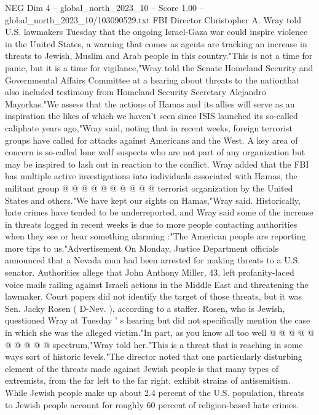 \begin{textsample}{NEG Dim 4 – global\_north\_2023\_10 – Score 1.00 – global\_north\_2023\_10/103090529.txt}  \label{ex:f4_neg_009}
FBI Director Christopher A.
Wray told U.S. lawmakers Tuesday that the ongoing Israel-Gaza war could inspire violence in the United States, a warning that comes as agents are tracking an increase in threats to Jewish, Muslim and Arab people in this country."This is not a time for panic, but it is a time for vigilance,"Wray told the Senate Homeland Security and Governmental Affairs Committee at a hearing about threats to the nationthat also included testimony from Homeland Security Secretary Alejandro Mayorkas."We assess that the actions of Hamas and its allies will serve as an inspiration the likes of which we haven't seen since ISIS launched its so-called caliphate years ago,"Wray said, noting that in recent weeks, foreign terrorist groups have called for attacks against Americans and the West.
A key area of concern is so-called lone wolf suspects who are not part of any organization but may be inspired to lash out in reaction to the conflict.
Wray added that the FBI has multiple active investigations into individuals associated with Hamas, the militant group @ @ @ @ @ @ @ @ @ @ terrorist organization by the United States and others."We have kept our sights on Hamas,"Wray said.
Historically, hate crimes have tended to be underreported, and Wray said some of the increase in threats logged in recent weeks is due to more people contacting authorities when they see or hear something alarming :"The American people are reporting more tips to us."Advertisement On Monday, Justice Department officials announced that a Nevada man had been arrested for making threats to a U.S. senator.
Authorities allege that John Anthony Miller, 43, left profanity-laced voice mails railing against Israeli actions in the Middle East and threatening the lawmaker.
Court papers did not identify the target of those threats, but it was Sen.
Jacky Rosen ( D-Nev. ), according to a staffer.
Rosen, who is Jewish, questioned Wray at Tuesday ' s hearing but did not specifically mention the case in which she was the alleged victim."In part, as you know all too well @ @ @ @ @ @ @ @ @ @ spectrum,"Wray told her."This is a threat that is reaching in some ways sort of historic levels."The director noted that one particularly disturbing element of the threats made against Jewish people is that many types of extremists, from the far left to the far right, exhibit strains of antisemitism.
While Jewish people make up about 2.4 percent of the U.S. population, threats to Jewish people account for roughly 60 percent of religion-based hate crimes.

\end{textsample}
